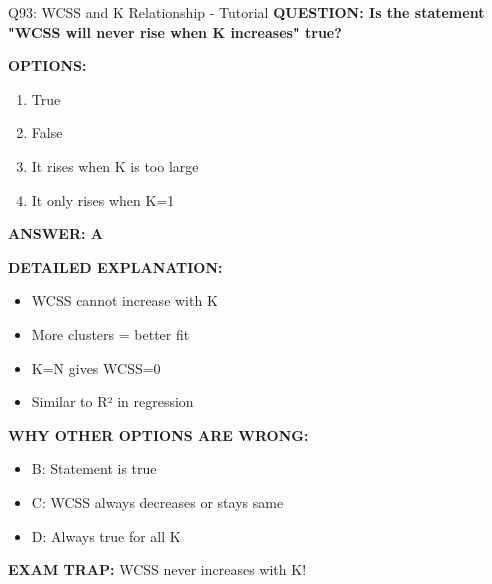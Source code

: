 \documentclass[8pt]{beamer}
\begin{document}
	\begin{frame}{Q93: WCSS and K Relationship - Tutorial}
		\fontsize{6.5}{7.5}\selectfont
		\textbf{QUESTION: Is the statement "WCSS will never rise when K increases" true?}
		
		\vspace{0.1cm}
		\textbf{OPTIONS:}
		\begin{enumerate}
			\item True
			\item False
			\item It rises when K is too large
			\item It only rises when K=1
		\end{enumerate}
		
		\vspace{0.1cm}
		\textcolor{myblue}{\textbf{ANSWER: A}}
		
		\vspace{0.1cm}
		\textbf{DETAILED EXPLANATION:}
		\begin{itemize}
			\item WCSS cannot increase with K
			\item More clusters = better fit
			\item K=N gives WCSS=0
			\item Similar to R² in regression
		\end{itemize}
		
		\vspace{0.1cm}
		\textcolor{myred}{\textbf{WHY OTHER OPTIONS ARE WRONG:}}
		\begin{itemize}
			\item \textcolor{myred}{B:} Statement is true
			\item \textcolor{myred}{C:} WCSS always decreases or stays same
			\item \textcolor{myred}{D:} Always true for all K
		\end{itemize}
		
		\textcolor{myred}{\textbf{EXAM TRAP:}} WCSS \textcolor{myblue}{never increases} with K!
	\end{frame}
	
\end{document}
